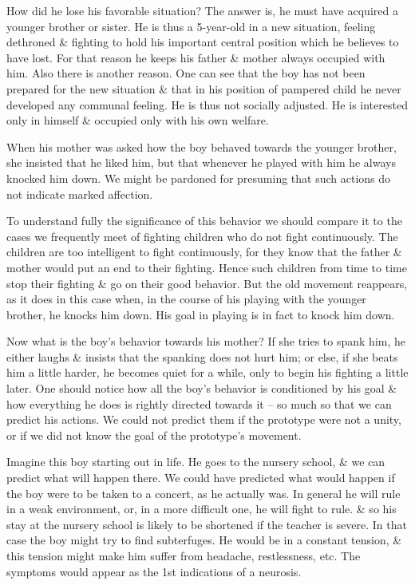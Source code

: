 \documentclass{article}
\begin{document}
How did he lose his favorable situation? The answer is, he must have acquired a younger brother or sister. He is thus a 5-year-old in a new situation, feeling dethroned \& fighting to hold his important central position which he believes to have lost. For that reason he keeps his father \& mother always occupied with him. Also there is another reason. One can see that the boy has not been prepared for the new situation \& that in his position of pampered child he never developed any communal feeling. He is thus not socially adjusted. He is interested only in himself \& occupied only with his own welfare.

When his mother was asked how the boy behaved towards the younger brother, she insisted that he liked him, but that whenever he played with him he always knocked him down. We might be pardoned for presuming that such actions do not indicate marked affection.

To understand fully the significance of this behavior we should compare it to the cases we frequently meet of fighting children who do not fight continuously. The children are too intelligent to fight continuously, for they know that the father \& mother would put an end to their fighting. Hence such children from time to time stop their fighting \& go on their good behavior. But the old movement reappears, as it does in this case when, in the course of his playing with the younger brother, he knocks him down. His goal in playing is in fact to knock him down.

Now what is the boy's behavior towards his mother? If she tries to spank him, he either laughs \& insists that the spanking does not hurt him; or else, if she beats him a little harder, he becomes quiet for a while, only to begin his fighting a little later. One should notice how all the boy's behavior is conditioned by his goal \& how everything he does is rightly directed towards it -- so much so that we can predict his actions. We could not predict them if the prototype were not a unity, or if we did not know the goal of the prototype's movement.

Imagine this boy starting out in life. He goes to the nursery school, \& we can predict what will happen there. We could have predicted what would happen if the boy were to be taken to a concert, as he actually was. In general he will rule in a weak environment, or, in a more difficult one, he will fight to rule. \& so his stay at the nursery school is likely to be shortened if the teacher is severe. In that case the boy might try to find subterfuges. He would be in a constant tension, \& this tension might make him suffer from headache, restlessness, etc. The symptoms would appear as the 1st indications of a neurosis.
\end{document}
